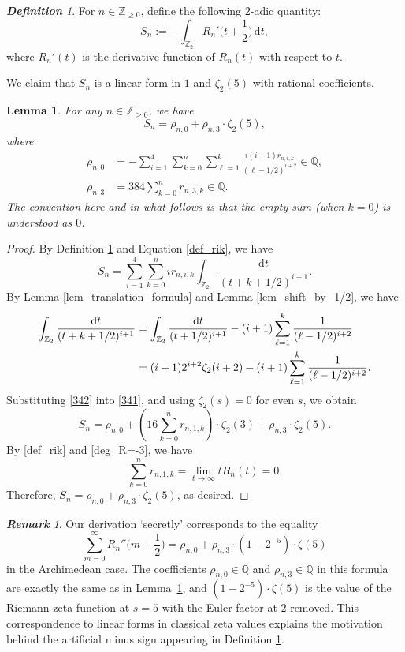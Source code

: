 \documentclass[12pt]{article}
\let\ge\geqslant
\renewcommand{\d}{\mathrm{d}}
\newtheorem{lemma}[theorem]{Lemma}
\theoremstyle{remark}
\newtheorem{definition}[theorem]{\bf Definition}
\newtheorem{remark}[theorem]{\bf Remark}
\numberwithin{equation}{section}
\begin{document}
\begin{definition}
\label{def_Sn}
For $n \in \mathbb{Z}_{\ge0}$, define the following $2$-adic quantity:
\[ 
S_n :=  - \int_{\mathbb{Z}_2} R_n'\Big( t+\frac{1}{2} \Big)\,\d t, 
\]
where $R_n'(t)$ is the derivative function of $R_n(t)$ with respect to $t$.
\end{definition}

We claim that $S_n$ is a linear form in $1$ and $\zeta_2(5)$ with rational coefficients.

\begin{lemma}
\label{lem_linear_forms}
For any $n \in \mathbb{Z}_{\ge0}$, we have
\[ 
S_n = \rho_{n,0} + \rho_{n,3} \cdot \zeta_2(5), 
\]
where
\begin{align}
\rho_{n,0} &= -\sum_{i=1}^{4}\sum_{k = 0}^{n}\sum_{\ell=1}^k \frac{i(i+1)r_{n,i,k}}{(\ell-1/2)^{i+2}} \in \mathbb{Q},
\label{def_rho_0}\\
\rho_{n,3} &= 384 \sum_{k=0}^{n} r_{n,3,k} \in \mathbb{Q}.
\label{def_rho_3}
\end{align}
The convention here and in what follows is that the empty sum \textup(when $k=0$\textup) is understood as $0$.
\end{lemma}

\begin{proof}
By Definition \ref{def_Sn} and Equation \eqref{def_rik}, we have
\begin{equation}
\label{341}
S_n =\sum_{i=1}^{4} \sum_{k=0}^{n} ir_{n,i,k}  \int_{\mathbb{Z}_2} \frac{\d t}{(t+k+1/2)^{i+1}}.
\end{equation}
By Lemma \ref{lem_translation_formula} and Lemma \ref{lem_shift_by_1/2}, we have
\begin{align}
\int_{\mathbb{Z}_2} \frac{\d t}{(t+k+1/2)^{i+1}}
&= \int_{\mathbb{Z}_2} \frac{\d t}{(t+1/2)^{i+1}} -(i+1)\sum_{\ell=1}^k \frac{1}{(\ell-1/2)^{i+2}} \notag\\
&= (i+1)2^{i+2}\zeta_2(i+2) -(i+1)\sum_{\ell=1}^k \frac{1}{(\ell-1/2)^{i+2}}.
\label{342}
\end{align}
Substituting \eqref{342} into \eqref{341}, and using $\zeta_2(s)=0$ for even $s$, we obtain 
\[ 
S_n = \rho_{n,0} + \left(16\sum_{k = 0}^{n} r_{n,1,k}\right) \cdot \zeta_2(3) + \rho_{n,3} \cdot \zeta_2(5). 
\]
By \eqref{def_rik} and \eqref{deg_R=-3}, we have 
\[ 
\sum_{k=0}^{n} r_{n,1,k} = \lim_{t \to \infty} tR_n(t) = 0. 
\]
Therefore, $S_n = \rho_{n,0} + \rho_{n,3} \cdot \zeta_2(5)$, as desired.
\end{proof}

\begin{remark}
\label{rem_diff_arch}
Our derivation `secretly' corresponds to the equality
\[ 
\sum_{m=0}^{\infty} R_n''\Big(m+\frac{1}{2}\Big) = \rho_{n,0} + \rho_{n,3} \cdot \left(1 - 2^{-5} \right)\cdot \zeta(5)
\]
in the Archimedean case.
The coefficients $\rho_{n,0} \in \mathbb{Q}$ and $\rho_{n,3} \in \mathbb{Q}$ in this formula are exactly the same as in Lemma~\ref{lem_linear_forms}, and $\left(1 - 2^{-5} \right)\cdot \zeta(5)$ is the value of the Riemann zeta function at $s=5$ with the Euler factor at $2$ removed. 
This correspondence to linear forms in classical zeta values explains the motivation behind the artificial minus sign appearing in Definition \ref{def_Sn}.
\end{remark}
\end{document}
